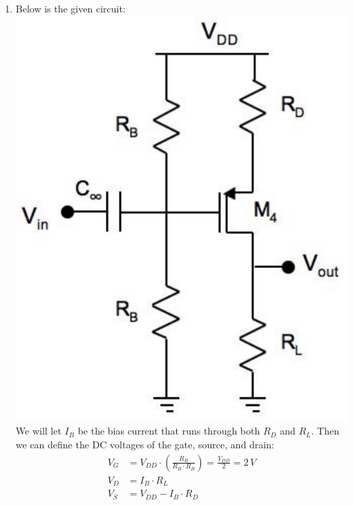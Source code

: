 \documentclass[12pt, fleqn]{article}
\begin{document}
\begin{enumerate}[label=(\alph*)]
    \item
    {
    Below is the given circuit:\\
    \includegraphics[scale=0.25, center]{p1a.png}\\
    We will let $I_B$ be the bias current that runs through both $R_D$ and $R_L$.  Then we can define the DC voltages of the gate, source, and drain:
    \begin{align}
        V_G &= V_{DD} \cdot \left(\frac{R_B}{R_B \cdot R_B}\right) = \frac{V_{DD}}{2} = 2\,V
        \label{eq:gate_v}\\[0.25cm]
        V_D &= I_B \cdot R_L
        \label{eq:drain_v}\\[0.25cm]
        V_S &= V_{DD} - I_B \cdot R_D
        \label{eq:source_v}
    \end{align}
    }
    

\end{enumerate}
\end{document}
